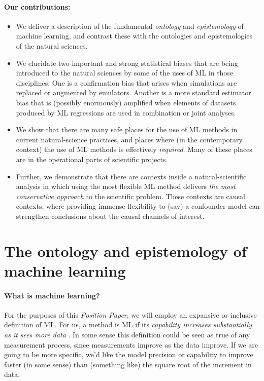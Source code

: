 \documentclass[11pt]{article}
\newcommand{\documentname}{\textsl{Position Paper}}
\begin{document}
\paragraph{Our contributions:}
\begin{itemize}
  \item We deliver a description of the fundamental \emph{ontology} and \emph{epistemology} of machine learning, and contrast these with the ontologies and epistemologies of the natural sciences.
  \item We elucidate two important and strong statistical biases that are being introduced to the natural sciences by some of the uses of ML in those disciplines. One is a confirmation bias that arises when simulations are replaced or augmented by emulators. Another is a more standard estimator bias that is (possibly enormously) amplified when elements of datasets produced by ML regressions are used in combination or joint analyses.
  \item We show that there are many safe places for the use of ML methods in current natural-science practices, and places where (in the contemporary context) the use of ML methods is effectively \emph{required}. Many of these places are in the operational parts of scientific projects.
  \item Further, we demonstrate that there are contexts inside a natural-scientific analysis in which using the most flexible ML method delivers \emph{the most conservative approach} to the scientific problem. These contexts are causal contexts, where providing immense flexibility to (say) a confounder model can strengthen conclusions about the causal channels of interest.
\end{itemize}

\section{The ontology and epistemology of machine learning}\label{sec:philosophy}

\paragraph{What is machine learning?}
For the purposes of this \documentname, we will employ an expansive or inclusive definition of ML.
For us, a method is ML if its \emph{capability increases substantially as it sees more data} \cite{ml_definition}.
In some sense this definition could be seen as true of any measurement process, since measurements improve as the data improve. 
If we are going to be more specific, we'd like the model precision or capability to improve faster (in some sense) than (something like) the square root of the increment in data.
\end{document}
